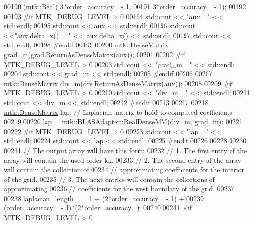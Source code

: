 \begin{DoxyCode}
00190                         (\hyperlink{group__c01-roots_gac080bbbf5cbb5502c9f00405f894857d}{mtk::Real}) 3*order\_accuracy\_ - 1,
00191                         3*order\_accuracy\_ - 1);
00192 
00193 \textcolor{preprocessor}{  #if MTK\_DEBUG\_LEVEL > 0}
00194   std::cout << \textcolor{stringliteral}{"aux ="} << std::endl;
00195   std::cout << aux << std::endl;
00196   std::cout <<\textcolor{stringliteral}{"aux.delta\_x() = "} << aux.\hyperlink{classmtk_1_1UniStgGrid1D_a6e7173b01241632cf509496d66b9f74c}{delta\_x}() << std::endl;
00197   std::cout << std::endl;
00198 \textcolor{preprocessor}{  #endif}
00199 
00200   \hyperlink{classmtk_1_1DenseMatrix}{mtk::DenseMatrix} grad\_m(grad.\hyperlink{classmtk_1_1Grad1D_a77b2eddbe4ab03f469306c604d505b1a}{ReturnAsDenseMatrix}(aux));
00201 
00202 \textcolor{preprocessor}{  #if MTK\_DEBUG\_LEVEL > 0}
00203   std::cout << \textcolor{stringliteral}{"grad\_m ="} << std::endl;
00204   std::cout << grad\_m << std::endl;
00205 \textcolor{preprocessor}{  #endif}
00206 
00207   \hyperlink{classmtk_1_1DenseMatrix}{mtk::DenseMatrix} div\_m(div.\hyperlink{classmtk_1_1Div1D_a213fddbaaf86e4840c6a9649b69c2d49}{ReturnAsDenseMatrix}(aux));
00208 
00209 \textcolor{preprocessor}{  #if MTK\_DEBUG\_LEVEL > 0}
00210   std::cout << \textcolor{stringliteral}{"div\_m ="} << std::endl;
00211   std::cout << div\_m << std::endl;
00212 \textcolor{preprocessor}{  #endif}
00213 
00217 
00218   \hyperlink{classmtk_1_1DenseMatrix}{mtk::DenseMatrix} lap; \textcolor{comment}{// Laplacian matrix to hold to computed coefficients.}
00219 
00220   lap = \hyperlink{classmtk_1_1BLASAdapter_acebd0e9bfe0bdd609c7fbea98ccfd3b5}{mtk::BLASAdapter::RealDenseMM}(div\_m, grad\_m);
00221 
00222 \textcolor{preprocessor}{  #if MTK\_DEBUG\_LEVEL > 0}
00223   std::cout << \textcolor{stringliteral}{"lap ="} << std::endl;
00224   std::cout << lap << std::endl;
00225 \textcolor{preprocessor}{  #endif}
00226 
00228 
00230 
00231   \textcolor{comment}{// The output array will have this form:}
00232   \textcolor{comment}{// 1. The first entry of the array will contain the used order kk.}
00233   \textcolor{comment}{// 2. The second entry of the array will contain the collection of}
00234   \textcolor{comment}{// approximating coefficients for the interior of the grid.}
00235   \textcolor{comment}{// 3. The next entries will contain the collections of approximating}
00236   \textcolor{comment}{// coefficients for the west boundary of the grid.}
00237 
00238   laplacian\_length\_ = 1 + (2*order\_accuracy\_ - 1) +
00239     (order\_accuracy\_ - 1)*(2*order\_accuracy\_);
00240 
00241 \textcolor{preprocessor}{  #if MTK\_DEBUG\_LEVEL > 0}

\end{DoxyCode}
